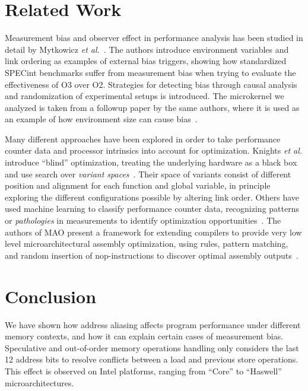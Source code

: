\documentclass[10pt, conference, compsocconf]{IEEEtran}
\begin{document}
\section{Related Work}
\label{sec:related}
Measurement bias and observer effect in performance analysis has been studied in detail by Mytkowicz \emph{et al.}~\cite{Mytkowicz:2008:OE&MB,Mytkowicz:2008:Easy}.
The authors introduce environment variables and link ordering as examples of external bias triggers, showing how standardized {\small SPECint} benchmarks suffer from measurement bias when trying to evaluate the effectiveness of O3 over O2. 
Strategies for detecting bias through causal analysis and randomization of experimental setups is introduced.
The microkernel we analyzed is taken from a followup paper by the same authors, where it is used as an example of how environment size can cause bias~\cite{Mytkowicz:2009:WrongData}.

Many different approaches have been explored in order to take performance counter data and processor intrinsics into account for optimization.
Knights \emph{et al.} introduce ``blind'' optimization, treating the underlying hardware as a black box and use search over \emph{variant spaces}~\cite{Knights:2009:BlindOpt}.
Their space of variants consist of different position and alignment for each function and global variable, in principle exploring the different configurations possible by altering link order.
Others have used machine learning to classify performance counter data, recognizing patterns or \emph{pathologies} in measurements to identify optimization opportunities~\cite{Yoo:ADD}.
The authors of MAO present a framework for extending compilers to provide very low level microarchitectural assembly optimization, using rules, pattern matching, and random insertion of nop-instructions to discover optimal assembly outputs~\cite{Hundt:2011:MAO}.


\section{Conclusion}
\label{sec:conclusions}
We have shown how address aliasing affects program performance under different memory contexts, and how it can explain certain cases of measurement bias.
Speculative and out-of-order memory operations handling only considers the last 12 address bits to resolve conflicts between a load and previous store operations.
This effect is observed on Intel platforms, ranging from ``Core'' to ``Haswell'' microarchitectures.
\end{document}
